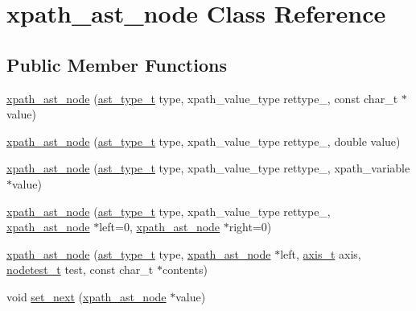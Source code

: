 \hypertarget{classxpath__ast__node}{\section{xpath\-\_\-ast\-\_\-node Class Reference}
\label{classxpath__ast__node}
}
\subsection*{Public Member Functions}
\begin{DoxyCompactItemize}
\item 
\hyperlink{classxpath__ast__node_af155d17a4477a693d37f4e34957dcc21}{xpath\-\_\-ast\-\_\-node} (\hyperlink{pugixml_8cpp_a11258a240266b84b6b0526930e5d330d}{ast\-\_\-type\-\_\-t} type, xpath\-\_\-value\-\_\-type rettype\-\_\-, const char\-\_\-t $\ast$value)
\item 
\hyperlink{classxpath__ast__node_ada97458f3fc7d6c87cf70d8084117b0d}{xpath\-\_\-ast\-\_\-node} (\hyperlink{pugixml_8cpp_a11258a240266b84b6b0526930e5d330d}{ast\-\_\-type\-\_\-t} type, xpath\-\_\-value\-\_\-type rettype\-\_\-, double value)
\item 
\hyperlink{classxpath__ast__node_a8de4244f7b9fc7626049197ddc0afab7}{xpath\-\_\-ast\-\_\-node} (\hyperlink{pugixml_8cpp_a11258a240266b84b6b0526930e5d330d}{ast\-\_\-type\-\_\-t} type, xpath\-\_\-value\-\_\-type rettype\-\_\-, xpath\-\_\-variable $\ast$value)
\item 
\hyperlink{classxpath__ast__node_af6f4ffea3f3c7fdb6ef1e759d4b070f4}{xpath\-\_\-ast\-\_\-node} (\hyperlink{pugixml_8cpp_a11258a240266b84b6b0526930e5d330d}{ast\-\_\-type\-\_\-t} type, xpath\-\_\-value\-\_\-type rettype\-\_\-, \hyperlink{classxpath__ast__node}{xpath\-\_\-ast\-\_\-node} $\ast$left=0, \hyperlink{classxpath__ast__node}{xpath\-\_\-ast\-\_\-node} $\ast$right=0)
\item 
\hyperlink{classxpath__ast__node_a7cf74b277deba86a6575796c727fe458}{xpath\-\_\-ast\-\_\-node} (\hyperlink{pugixml_8cpp_a11258a240266b84b6b0526930e5d330d}{ast\-\_\-type\-\_\-t} type, \hyperlink{classxpath__ast__node}{xpath\-\_\-ast\-\_\-node} $\ast$left, \hyperlink{pugixml_8cpp_ae7747145441b0591a5c04f20f6f9189a}{axis\-\_\-t} axis, \hyperlink{pugixml_8cpp_ab268b4264276130baeb17ab629015275}{nodetest\-\_\-t} test, const char\-\_\-t $\ast$contents)
\item 
void \hyperlink{classxpath__ast__node_a2764184d076834284eb3ff3182b845cc}{set\-\_\-next} (\hyperlink{classxpath__ast__node}{xpath\-\_\-ast\-\_\-node} $\ast$value)

\end{DoxyCompactItemize}
